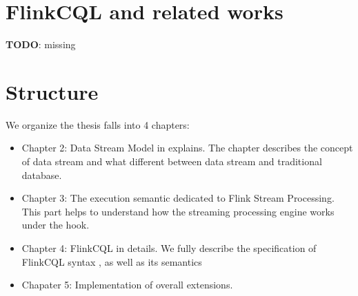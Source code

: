 \section*{FlinkCQL and related works}
\textbf{TODO}: missing

\section*{Structure}
We organize the thesis falls into 4 chapters:
\begin{itemize}
	\item Chapter 2: Data Stream Model in explains. The chapter describes the concept of data stream and what different between data stream and traditional database. 
	\item Chapter 3: The execution semantic dedicated to Flink Stream Processing. This part helps to understand how the streaming processing engine works under the hook.
	\item Chapter 4: FlinkCQL in details. We fully describe the specification of FlinkCQL syntax , as well as its semantics
	\item Chapater 5: Implementation of overall extensions.
\end{itemize}







 
 
 

